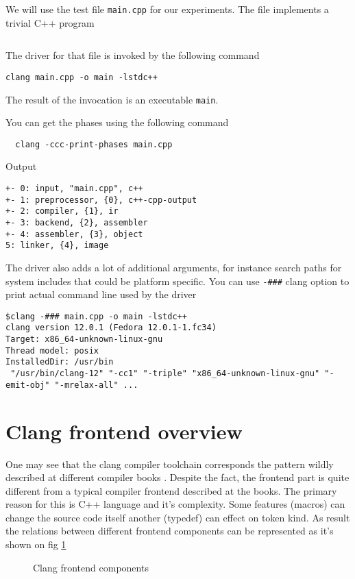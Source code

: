 We will use the test file \texttt{main.cpp} for our experiments. The
file implements a trivial C++ program
\inputminted{c++}{./src/simple/main.cpp}

The driver for that file is invoked by the following command
\begin{verbatim}
clang main.cpp -o main -lstdc++
\end{verbatim}
The result of the invocation is an executable \texttt{main}. 

You can get the phases using the following command
\begin{verbatim}
  clang -ccc-print-phases main.cpp
\end{verbatim}

Output
\begin{verbatim}
+- 0: input, "main.cpp", c++
+- 1: preprocessor, {0}, c++-cpp-output
+- 2: compiler, {1}, ir
+- 3: backend, {2}, assembler
+- 4: assembler, {3}, object
5: linker, {4}, image
\end{verbatim}

The driver also adds a lot of additional arguments, for instance
search paths for system includes that could be platform specific.
You can use \texttt{-###} clang option to print actual
command line used by the driver
\begin{verbatim}
$clang -### main.cpp -o main -lstdc++
clang version 12.0.1 (Fedora 12.0.1-1.fc34)
Target: x86_64-unknown-linux-gnu
Thread model: posix
InstalledDir: /usr/bin
 "/usr/bin/clang-12" "-cc1" "-triple" "x86_64-unknown-linux-gnu" "-emit-obj" "-mrelax-all" ...
\end{verbatim}

\section{Clang frontend overview}
One may see that the clang compiler toolchain corresponds the pattern
wildly described at different compiler books
\cite{book:engineering_a_compiler}. Despite the fact, the frontend
part is quite different from a typical compiler frontend described at
the books. The primary reason for this is C++ language and it's
complexity. Some features (macros) can change the source code itself
another (typedef) can effect on token kind. As result the relations
between different frontend components can be represented as it's shown
on fig \ref{fig:clang_frontend}
\begin{figure}
\begin{center}
\end{center}
  \caption{Clang frontend components}
  \label{fig:clang_frontend}
\end{figure}

